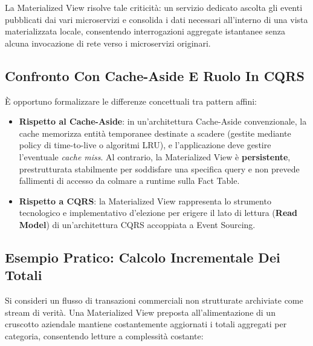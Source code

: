\documentclass[11pt, a4paper]{article}
\begin{document}
La Materialized View risolve tale criticità: un servizio dedicato ascolta gli eventi pubblicati dai vari microservizi e consolida i dati necessari all'interno di una vista materializzata locale, consentendo interrogazioni aggregate istantanee senza alcuna invocazione di rete verso i microservizi originari.

\subsection{Confronto Con Cache-Aside E Ruolo In CQRS}

È opportuno formalizzare le differenze concettuali tra pattern affini:
\begin{itemize}
    \item \textbf{Rispetto al Cache-Aside}: in un'architettura Cache-Aside convenzionale, la cache memorizza entità temporanee destinate a scadere (gestite mediante policy di time-to-live o algoritmi LRU), e l'applicazione deve gestire l'eventuale \emph{cache miss}. Al contrario, la Materialized View è \textbf{persistente}, prestrutturata stabilmente per soddisfare una specifica query e non prevede fallimenti di accesso da colmare a runtime sulla Fact Table.
    \item \textbf{Rispetto a CQRS}: la Materialized View rappresenta lo strumento tecnologico e implementativo d'elezione per erigere il lato di lettura (\textbf{Read Model}) di un'architettura CQRS accoppiata a Event Sourcing.
\end{itemize}

\subsection{Esempio Pratico: Calcolo Incrementale Dei Totali}

Si consideri un flusso di transazioni commerciali non strutturate archiviate come stream di verità. Una Materialized View preposta all'alimentazione di un cruscotto aziendale mantiene costantemente aggiornati i totali aggregati per categoria, consentendo letture a complessità costante:

\end{document}
